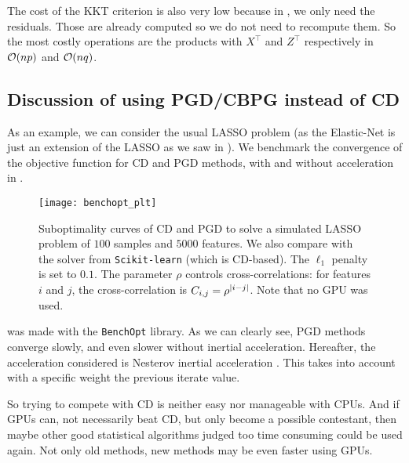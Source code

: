 \documentclass[../main.tex]{subfiles}
\begin{document}
\medskip

The cost of the KKT criterion is also very low because in ,
we only need the residuals.
Those are already computed so we do not need to recompute them.
So the most costly operations are the products with $X^\top$ and $Z^\top$
respectively in $\mathcal{O}(np)$ and $\mathcal{O}(nq)$.

\subsection{Discussion of using PGD/CBPG instead of CD}

As an example, we can consider the usual LASSO problem (as the Elastic-Net
is just an extension of the LASSO as we saw in ).
We benchmark the convergence of the objective function
for CD and PGD methods, with and without acceleration in .
\begin{figure}[h]
	\centering
	\texttt{[image: benchopt\_plt]}
	\caption{
		Suboptimality curves of CD and PGD to solve a simulated LASSO problem of
		$100$ samples and $5000$ features.
		We also compare with the solver from \texttt{Scikit-learn} (which is CD-based).
		The $\ell_1$ penalty is set to $0.1$.
		The parameter $\rho$ controls cross-correlations: for features $i$ and $j$,
		the cross-correlation is $C_{i,j} = \rho^{\left \vert i-j \right \vert}$.
		Note that no GPU was used.
		}
		\label{fig:benchopt}
	\end{figure}

 was made with the \texttt{BenchOpt} library\protect\footnotemark.
As we can clearly see, PGD methods converge slowly, and even slower without
inertial acceleration.
Hereafter, the acceleration considered is Nesterov inertial acceleration
\citep{nesterov27method}.
This takes into account with a specific weight the previous iterate value.


\medskip

So trying to compete with CD is neither easy nor manageable with CPUs.
And if GPUs can, not necessarily beat CD, but only become a possible contestant,
then maybe other good statistical algorithms judged too time consuming could be
used again.
Not only old methods, new methods may be even faster using GPUs.
\end{document}
